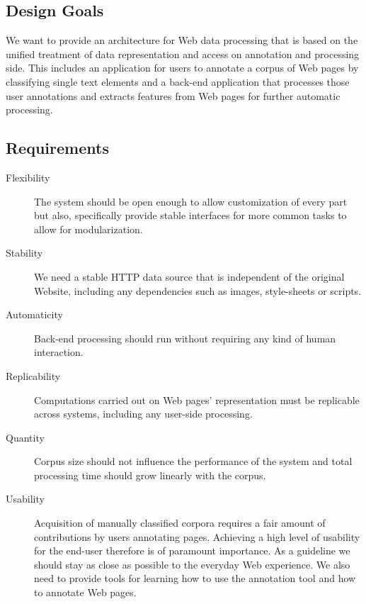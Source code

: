 \subsection{Design Goals}

We want to provide an architecture for Web data processing that is based on the unified treatment of data representation and access on annotation and processing side.
This includes an application for users to annotate a corpus of Web pages by classifying single text elements and
a back-end application that processes those user annotations and extracts features from Web pages for further automatic processing. 

\subsection{Requirements}

\begin{description}

\item[Flexibility]
The system should be open enough to allow customization of every part but also, specifically provide stable interfaces for more common tasks to allow for modularization.

\item[Stability]
We need a stable HTTP data source that is independent of the original Website, including any dependencies such as images, style-sheets or scripts.

\item[Automaticity]
Back-end processing should run without requiring any kind of human interaction.

\item[Replicability]
Computations carried out on Web pages' representation must be replicable across systems, including any user-side processing.

\item[Quantity]
Corpus size should not influence the performance of the system and total processing time should grow linearly with the corpus.

\item[Usability]
Acquisition of manually classified corpora requires a fair amount of contributions by users annotating pages.
Achieving a high level of usability for the end-user therefore is of paramount importance.
As a guideline we should stay as close as possible to the everyday Web experience.
We also need to provide tools for learning how to use the annotation tool and how to annotate Web pages.

\end{description}

